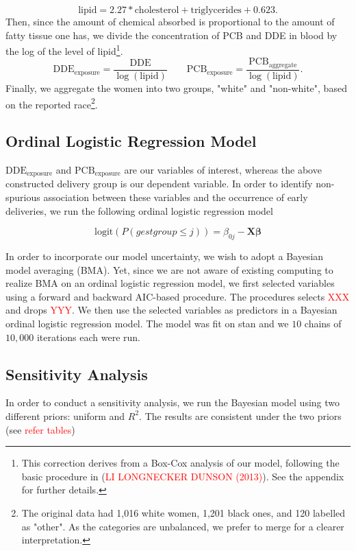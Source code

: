 \documentclass[wcp]{jmlr}%
\newcommand\todo[1]{\textcolor{red}{#1}}
\begin{document}
\begin{equation}
\label{eq:fat}
\text{lipid} = 2.27 * \text{cholesterol} + \text{triglycerides} + 0.623.
\end{equation}
Then, since the amount of chemical absorbed is proportional to the amount of fatty tissue one has, we divide the concentration of PCB and DDE in blood by the log of the level of lipid\footnote{This correction derives from a Box-Cox analysis of our model, following the basic procedure in (\todo{LI LONGNECKER DUNSON (2013)}). See the appendix for further details.}.
\begin{equation}
\label{eq:exp_dde_pcb}
\text{DDE}_{\text{exposure}} = \dfrac{\text{DDE}}{\log(\text{lipid})} \qquad \text{PCB}_{\text{exposure}} = \dfrac{\text{PCB}_\text{aggregate}}{\log(\text{lipid})}.
\end{equation}
Finally, we aggregate the women into two groups, "white" and "non-white", based on the reported race\footnote{The original data had 1,016 white women, 1,201 black ones, and 120 labelled as "other". As the categories are unbalanced, we prefer to merge for a clearer interpretation.}.

\subsection{Ordinal Logistic Regression Model}
$\text{DDE}_{\text{exposure}}$ and $\text{PCB}_{\text{exposure}}$ are our variables of interest, whereas the above constructed delivery group is our dependent variable. In order to identify non-spurious association between these variables and the occurrence of early deliveries, we run the following ordinal logistic regression model 

\begin{equation}
\label{eq:ordi_logit}
\text{logit}(P(gestgroup \le j)) = \beta_{0j} - \mathbf{X} \boldsymbol{\beta}
\end{equation}

In order to incorporate our model uncertainty, we wish to adopt a Bayesian model averaging (BMA). Yet, since we are not aware of existing computing to realize BMA on an ordinal logistic regression model, we first selected variables using a forward and backward AIC-based procedure. The procedures selects \todo{XXX} and drops \todo{YYY}. We then use the selected variables as predictors in a Bayesian ordinal logistic regression model. The model was fit on stan and we $10$ chains of $10,000$ iterations each were run.

\subsection*{Sensitivity Analysis}
In order to conduct a sensitivity analysis, we run the Bayesian model using two different priors: uniform and $R^2$. The results are consistent under the two priors (see \todo{refer tables})
\end{document}
